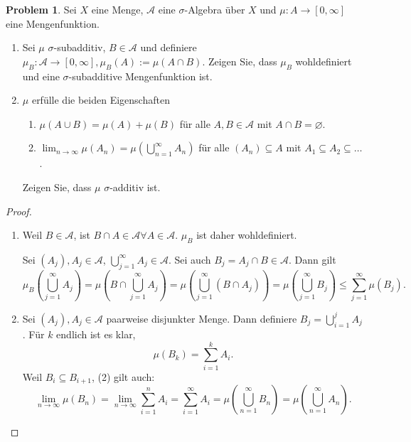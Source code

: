 \documentclass[prb,12pt]{revtex4-2}
\theoremstyle{definition}
\newtheorem{Problem}{Problem}
\theoremstyle{definition}
\newenvironment{parts}{\begin{enumerate}[label=(\alph*)]}{\end{enumerate}}
\begin{document}
\begin{Problem}
	Sei $X$ eine Menge, $\mathcal A$ eine $\sigma$-Algebra über $X$ und $\mu : A \to [0, \infty]$ eine Mengenfunktion.
	\begin{parts}
	\item  Sei $\mu$ $\sigma$-subadditiv, $B \in \mathcal A$ und definiere $\mu_B : \mathcal A \to [0,\infty ], \mu_B (A) := \mu(A \cap B)$. Zeigen Sie, dass $\mu_B$ wohldefiniert und eine $\sigma$-subadditive Mengenfunktion ist.
	\item $\mu$ erf\"{u}lle die beiden Eigenschaften
		\begin{enumerate}[label=(\arabic*)]
			\item $\mu(A\cup B)=\mu(A)+\mu(B)$ f\"{u}r alle $A,B\in \mathcal A$ mit $A\cap B=\varnothing$.
			\item $\lim_{n \to \infty} \mu\left( A_n \right) =\mu\left( \bigcup_{n=1} ^\infty A_n \right) $ f\"{u}r alle $(A_n)\subseteq A$ mit $A_1\subseteq A_2\subseteq \dots$.
		\end{enumerate}
		Zeigen Sie, dass $\mu$ $\sigma$-additiv ist.
	\end{parts}
\end{Problem}
\begin{proof}
	\begin{parts}
	\item Weil $B\in\mathcal A$, ist $B\cap A\in\mathcal A \forall A\in\mathcal A$. $\mu_B$ ist daher wohldefiniert. 

	Sei $(A_j), A_j\in\mathcal A$, $\bigcup_{j=1}^\infty A_j\in\mathcal A$. Sei auch $B_j=A_j\cap B\in \mathcal A$. Dann gilt
	\[
		\mu_B\left( \bigcup_{j=1} ^\infty A_j \right) =\mu\left( B\cap \bigcup_{j=1} ^\infty A_j \right) =\mu \left( \bigcup_{j=1} ^\infty \left( B\cap A_j \right)  \right)=\mu\left( \bigcup_{j=1} ^\infty B_j \right) \le \sum_{j=1}^\infty \mu(B_j) 
	.\] 
	\item Sei $(A_j), A_j\in\mathcal A$ paarweise disjunkter Menge. Dann definiere $B_j=\bigcup_{i=1}^j A_j$. F\"{u}r $k$ endlich ist es klar,
		\[
			\mu(B_k)=\sum_{i=1}^k A_i
		.\]
		Weil $B_i\subseteq B_{i+1}$, (2) gilt auch:
		\[
			\lim_{n \to \infty} \mu(B_n)=\lim_{n \to \infty} \sum_{i=1}^n A_i=\sum_{i=1}^\infty A_i=\mu\left( \bigcup_{n=1} ^\infty B_n \right) =\mu\left( \bigcup_{n=1} ^\infty A_n \right) 
		.\] 
	\end{parts}
\end{proof}
\end{document}

